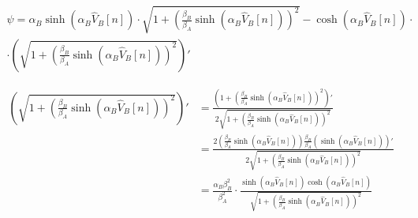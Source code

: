 	\begin{equation}
		\begin{split}
			\psi = \alpha_{B}\sinh(\alpha_{B}\widehat V_{B}[n])\cdot\sqrt{1+\left(\frac{\beta_{B}}{\beta_{A}}\sinh(\alpha_{B}\widehat V_{B}[n])\right)^{2}}-\cosh(\alpha_{B}\widehat V_{B}[n])\cdot\\
			\cdot\left(\sqrt{1+\left(\frac{\beta_{B}}{\beta_{A}}\sinh(\alpha_{B}\widehat V_{B}[n])\right)^{2}}\right)'
		\end{split}
	\end{equation}
	
	\begin{equation}
		\begin{split}
			\left(\sqrt{1+\left(\frac{\beta_{B}}{\beta_{A}}\sinh(\alpha_{B}\widehat V_{B}[n])\right)^{2}}\right)' &= \frac{\left(1+\left(\frac{\beta_{B}}{\beta_{A}}\sinh(\alpha_{B}\widehat V_{B}[n])\right)^{2}\right)'}{2\sqrt{1+\left(\frac{\beta_{B}}{\beta_{A}}\sinh(\alpha_{B}\widehat V_{B}[n])\right)^{2}}}\\
			&= \frac{2\left(\frac{\beta_{B}}{\beta_{A}}\sinh(\alpha_{B}\widehat V_{B}[n])\right)\frac{\beta_{B}}{\beta_{A}}\left(\sinh(\alpha_{B}\widehat V_{B}[n])\right)'}{2\sqrt{1+\left(\frac{\beta_{B}}{\beta_{A}}\sinh(\alpha_{B}\widehat V_{B}[n])\right)^{2}}}\\
			&= \frac{\alpha_{B}\beta_{B}^{2}}{\beta_{A}^{2}}\cdot\frac{\sinh(\alpha_{B}\widehat V_{B}[n])\cosh(\alpha_{B}\widehat V_{B}[n])}{\sqrt{1+\left(\frac{\beta_{B}}{\beta_{A}}\sinh(\alpha_{B}\widehat V_{B}[n])\right)^{2}}}
		\end{split}
	\end{equation}
	
